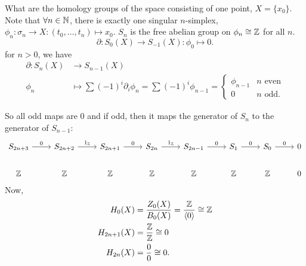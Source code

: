 \begin{eg}
    What are the homology groups of the space consisting of one point, $X = \{x_0\}$.
    Note that $\forall n \in \mathbb{N}$, there is exactly one singular $n$-simplex, $\phi_n: \sigma_n \to  X: (t_0, \ldots, t_n) \mapsto x_0$.
    $S_n$ is the free abelian group on $\phi_n \cong \mathbb{Z}$ for all $n$.
    \[
        \partial: S_0(X) \to  S_{-1}(X): \phi_0 \mapsto 0
    .\] 
    for $n >0$, we have
     \begin{align*}
         \partial: S_n(X) &\to  S_{n-1}(X)\\
         \phi_n &\mapsto \sum (-1)^{i} \partial_i \phi_n = \sum (-1)^{i} \phi_{n-1} = 
         \begin{cases}
             \phi_{n-1} &\text{$n$ even}\\
             0 &\text{$n$ odd.}
         \end{cases}
    \end{align*} 

    So all odd maps are $0$ and if odd, then it maps the generator of $S_n$ to the generator of $S_{n-1}$:
    \[
        \begin{tikzcd}
            S_{2n + 3} \arrow[r, "0"] &
            S_{2n + 2} \arrow[r, "1_{\Z}"] &
            S_{2n + 1} \arrow[r, "0"] &
            S_{2n} \arrow[r, "1_{\Z}"] &
            S_{2n - 1} \arrow[r, "0"] &
            S_{1} \arrow[r, "0"] &
            S_{0} \arrow[r, "0"] &
            0\\
            \Z & \Z & \Z & \Z & \Z & \Z & \Z & 0
        \end{tikzcd}
    \]
    Now, 
    \begin{align*}
        H_0(X) &= \frac{Z_0(X)}{B_0(X)} = \frac{\mathbb{Z}}{\left<0 \right>} \cong \mathbb{Z}\\
        H_{2n+1}(X) &= \frac{\mathbb{Z}}{\mathbb{Z}} \cong  0\\
        H_{2n}(X) &= \frac{0}{0} \cong 0
    .\end{align*}
\end{eg}

